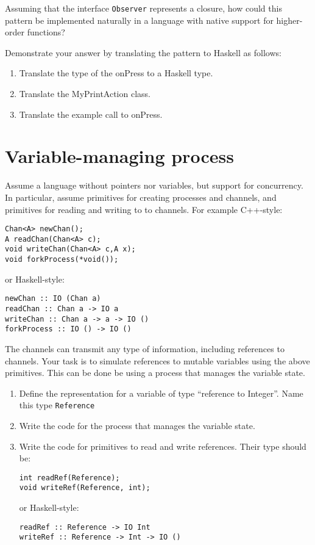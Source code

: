 \documentclass{article}
\begin{document}
Assuming that the interface \texttt{Observer} represents a closure, how
could this pattern be implemented naturally in a language with native
support for higher-order functions?

Demonstrate your answer by translating the pattern to Haskell as
follows:
\begin{enumerate}
\item Translate the type of the onPress to a Haskell type.
\item Translate the MyPrintAction class.
\item Translate the example call to onPress.
\end{enumerate}

\section{Variable-managing process}

Assume a language without pointers nor variables, but support for
concurrency. In particular, assume primitives for creating processes
and channels, and primitives for reading and writing to to
channels. For example C++-style:

\begin{verbatim}
Chan<A> newChan();
A readChan(Chan<A> c);
void writeChan(Chan<A> c,A x);
void forkProcess(*void());
\end{verbatim}
or Haskell-style:
\begin{verbatim}
newChan :: IO (Chan a)
readChan :: Chan a -> IO a
writeChan :: Chan a -> a -> IO ()
forkProcess :: IO () -> IO ()
\end{verbatim}

The channels can transmit any type of information, including
references to channels. Your task is to simulate references to mutable
variables using the above primitives. This can be done be using a
process that manages the variable state.

\begin{enumerate}
\item Define the representation for a variable of type ``reference to
  Integer''. Name this type \texttt{Reference}
\item Write the code for the process that manages the variable state.
\item Write the code for primitives to read and write references.
Their type should be:
\begin{verbatim}
int readRef(Reference);
void writeRef(Reference, int);
\end{verbatim}
or Haskell-style:
\begin{verbatim}
readRef :: Reference -> IO Int
writeRef :: Reference -> Int -> IO ()
\end{verbatim}
\end{enumerate}
\end{document}
